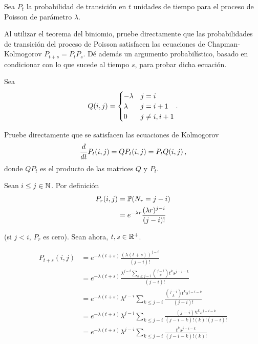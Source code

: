 \begin{problema}
    Sea $P_t$ la probabilidad de transici\'on en $t$ unidades de tiempo para el proceso de Poisson de 
    par\'ametro $\lambda$. 

    Al utilizar el teorema del biniomio, pruebe directamente que las probabilidades de transici\'on del 
    proceso de Poisson satisfacen las ecuaciones de Chapman-Kolmogorov $P_{t+s}=P_tP_s$. D\'e adem\'as un 
    argumento probabil\'istico, basado en condicionar con lo que sucede al tiempo $s$, para probar dicha ecuaci\'on. 

    Sea
    \begin{align}\label{problema5_4:definicionQ}
        \imf{Q}{i,j}=
            \begin{cases}
                -\lambda    &   j   =       i     \\
                \lambda     &   j   =       i+1   \\
                0           &   j   \neq    i,i+1
            \end{cases}.
    \end{align}

    Pruebe directamente que se satisfacen las ecuaciones de Kolmogorov
    \begin{equation*} %
        \frac{d}{dt}\imf{P_t}{i,j}=\imf{QP_t}{i,j}=\imf{P_tQ}{i,j},
    \end{equation*}
    donde $QP_t$ es el producto de las matrices $Q$ y $P_t$.
\end{problema}

\afterstatement\pn

Sean $i \leq j \in \N$. Por definición
\begin{align}
    P_r(i, j)   &=  \P(N_r = j-i)   \\
                &=  e^{-\lambda r}   \frac{(\lambda r)^{j - i}}{(j - i)!}
\end{align}\pn

(si $j < i$, $P_r$ es cero). Sean ahora, $t,s \in \R^+$.

\begin{align}
    P_{t + s}(i,j)  &=  e^{-\lambda (t+s)}  \frac{(\lambda(t+s))^{j-i}}{(j-i)!}                                                 \\
                    &=  e^{-\lambda (t+s)}  \frac{\lambda^{j-i} \sum_{k \leq j-i} \binom{j-i}{k} t^k s^{j-i-k}}{(j-i)!}         \\
                    &=  e^{-\lambda (t+s)} \lambda^{j-i} \sum_{k \leq j-i} \frac{ \binom{j-i}{k} t^k s^{j-i-k}}{(j-i)!}         \\
                    &=  e^{-\lambda (t+s)} \lambda^{j-i} \sum_{k \leq j-i} \frac{ (j-i)! t^k s^{j-i-k}}{(j-i-k)!(k)!(j-i)!}     \\
                    &=  e^{-\lambda (t+s)} \lambda^{j-i} \sum_{k \leq j-i} \frac{ t^k s^{j-i-k}}{(j-i-k)!(k)!}     \\
\end{align} 

